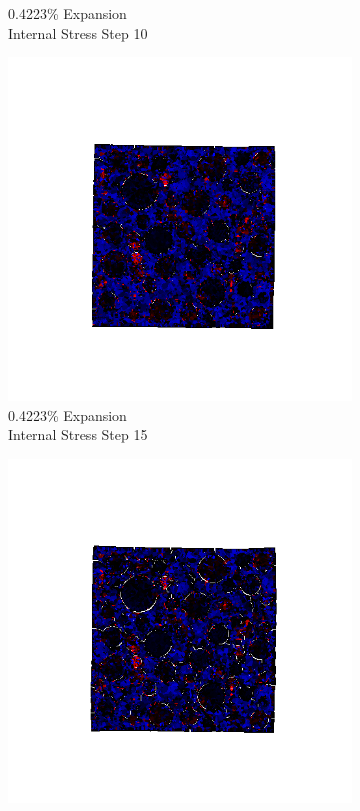 \begin{figure}[ht!]
\begin{subfigure}{.25\textwidth}
      \caption{0.4223\% Expansion\\Internal Stress Step 10}
    \end{subfigure}%
    \begin{subfigure}{.25\textwidth}
      \centering
      \includegraphics[width=1.0\linewidth]{Files/exp_3D/ASR/A30P75_3_s15.png}
      \caption{0.4223\% Expansion\\Internal Stress Step 15}
    \end{subfigure}%
    \begin{subfigure}{.25\textwidth}
      \centering
      \includegraphics[width=1.0\linewidth]{Files/exp_3D/ASR/A30P75_3_stress.png}

\end{subfigure}
\end{figure}
